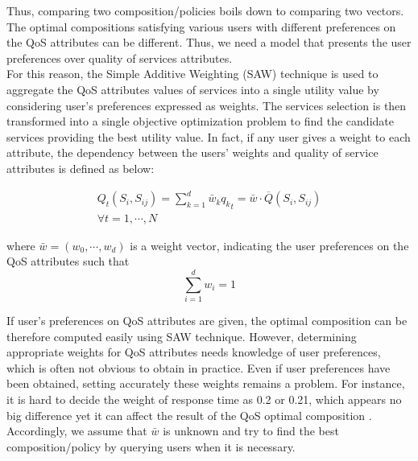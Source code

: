 \documentclass[10pt,journal,compsoc]{IEEEtran}
\newtheorem{example}{Example}
\begin{document}
Thus, comparing two composition/policies boils down to comparing two vectors. The optimal compositions satisfying various users with different preferences on the QoS attributes can be different. Thus, we need a model that presents the user preferences over quality of services attributes. \\


For this reason, the Simple Additive Weighting (SAW) technique \cite{qi2010combining} is used to aggregate the QoS attributes values of services into a single utility value by considering user's preferences expressed as weights. The services selection is then transformed into a single objective optimization problem to find the candidate services providing the best utility value. In fact, if any user gives a  weight to each attribute, the dependency between the users' weights and quality of service attributes is defined as below:

\begin{multline}
Q_t(S_i, S_{ij}) = \sum_{k=1}^d \bar{w}_k {q_k}_t = \bar{w} \cdot \overline{Q}(S_i, S_{ij}) \\
\forall t = 1, \cdots, N
\end{multline}

where $\bar{w} = (w_0, \cdots, w_d) $ is a weight vector, indicating the user preferences on the QoS attributes such that 
\begin{equation*}
\sum_{i=1}^d w_i = 1
\end{equation*}

If user's preferences on QoS attributes are given, the optimal composition can be therefore computed easily using SAW technique. However, determining appropriate weights for QoS attributes needs knowledge of user preferences, which is often not obvious to obtain in practice. Even if user preferences have been obtained, setting accurately these weights remains a problem. For instance, it is hard to decide the weight of response time as 0.2 or 0.21, which appears no big difference yet it can affect the result of the QoS optimal composition \cite{chen2015partial}. Accordingly, we assume that $\bar{w}$ is unknown and try to find the best composition/policy by querying users when it is necessary.\\
\end{document}
